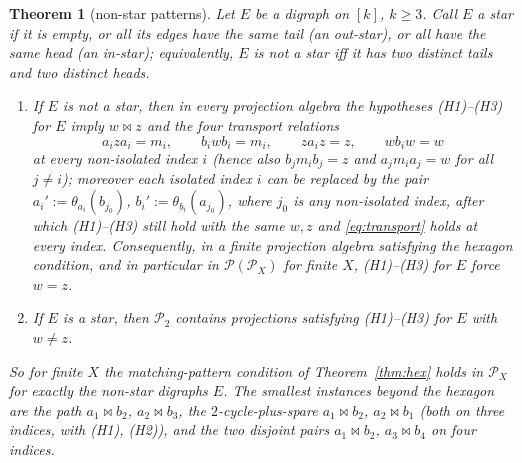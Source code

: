 \documentclass[11pt]{amsart}
\newtheorem{theorem}{Theorem}[section]
\theoremstyle{definition}
\renewcommand{\P}{\mathcal{P}}
\begin{document}
\begin{theorem}[non-star patterns]\label{prop:path}
Let $E$ be a digraph on $[k]$, $k\ge3$. Call $E$ a \emph{star} if it is empty, or all its edges have the same tail (an out-star), or all have the same head (an in-star); equivalently, $E$ is not a star iff it has two distinct tails and two distinct heads.
\begin{enumerate}[label=\textup{(\alph*)}]
\item If $E$ is not a star, then in every projection algebra the hypotheses (H1)--(H3) for $E$ imply $w\bowtie z$ and the four transport relations
\begin{equation}\label{eq:transport}
a_iza_i=m_i,\qquad b_iwb_i=m_i,\qquad za_iz=z,\qquad wb_iw=w
\end{equation}
at every non-isolated index $i$ (hence also $b_jm_ib_j=z$ and $a_jm_ia_j=w$ for all $j\ne i$); moreover each isolated index $i$ can be replaced by the pair $a_i':=\theta_{a_i}(b_{j_0})$, $b_i':=\theta_{b_i}(a_{j_0})$, where $j_0$ is any non-isolated index, after which (H1)--(H3) still hold with the same $w,z$ and \eqref{eq:transport} holds at every index. Consequently, in a finite projection algebra satisfying the hexagon condition, and in particular in $\P(\P_X)$ for finite $X$, (H1)--(H3) for $E$ force $w=z$.
\item If $E$ is a star, then $\P_2$ contains projections satisfying (H1)--(H3) for $E$ with $w\ne z$.
\end{enumerate}
So for finite $X$ the matching-pattern condition of Theorem~\ref{thm:hex} holds in $\P_X$ for exactly the non-star digraphs $E$. The smallest instances beyond the hexagon are the \emph{path} $a_1\bowtie b_2$, $a_2\bowtie b_3$, the \emph{$2$-cycle-plus-spare} $a_1\bowtie b_2$, $a_2\bowtie b_1$ (both on three indices, with (H1), (H2)), and the \emph{two disjoint pairs} $a_1\bowtie b_2$, $a_3\bowtie b_4$ on four indices.
\end{theorem}
\end{document}
